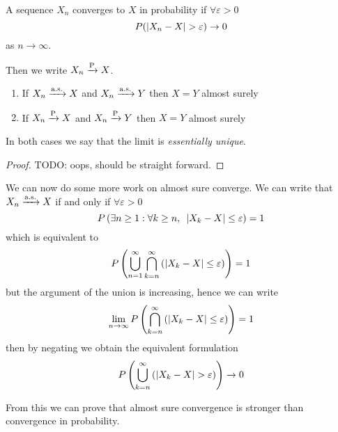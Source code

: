 \documentclass[12pt]{extarticle}
\newcommand{\convas}{\xrightarrow{\operatorfont a.s.}}
\newcommand{\convprob}{\xrightarrow{\operatorfont P}}
\begin{document}
\begin{definition}
    A sequence $X_n$ converges to $X$ in probability if $\forall \varepsilon > 0$
    \begin{equation}
        P(\abs{X_n - X} > \varepsilon) \to 0
    \end{equation}
    as $n \to \infty$.

    Then we write $X_n \convprob X$.
\end{definition}

\begin{theorem}
    \skiplineafterproof
    \begin{enumerate}
        \item If $X_n \convas X$ and $X_n \convas Y$ then $X = Y$ almost surely
        \item If $X_n \convprob X$ and $X_n \convprob Y$ then $X = Y$ almost surely
    \end{enumerate}
    In both cases we say that the limit is \emph{essentially unique}.
\end{theorem}

\begin{proof}
    TODO: oops, should be straight forward.
\end{proof}

We can now do some more work on almost sure converge.
We can write that $X_n \convas X$ if and only if $\forall \varepsilon > 0$
\begin{equation}
    P\left(\exists n \geq 1 : \forall k \geq n, \enspace \abs{X_k - X} \leq \varepsilon\right) = 1
\end{equation}
which is equivalent to
\begin{equation}
    P\left( \bigcup_{n = 1}^\infty \bigcap_{k = n}^\infty \left(\abs{X_k - X} \leq \varepsilon\right) \right) = 1
\end{equation}
but the argument of the union is increasing, hence we can write
\begin{equation}
    \lim_{n \to \infty} P\left( \bigcap_{k = n}^\infty \left( \abs{X_k - X} \leq \varepsilon \right) \right) = 1
\end{equation}
then by negating we obtain the equivalent formulation
\begin{equation}
    \label{eq:conv:as_alternative}
    P\left(\bigcup_{k = n}^\infty \left( \abs{X_k - X} > \varepsilon \right)\right) \to 0
\end{equation}

From this we can prove that almost sure convergence is stronger than convergence in probability.
\end{document}
